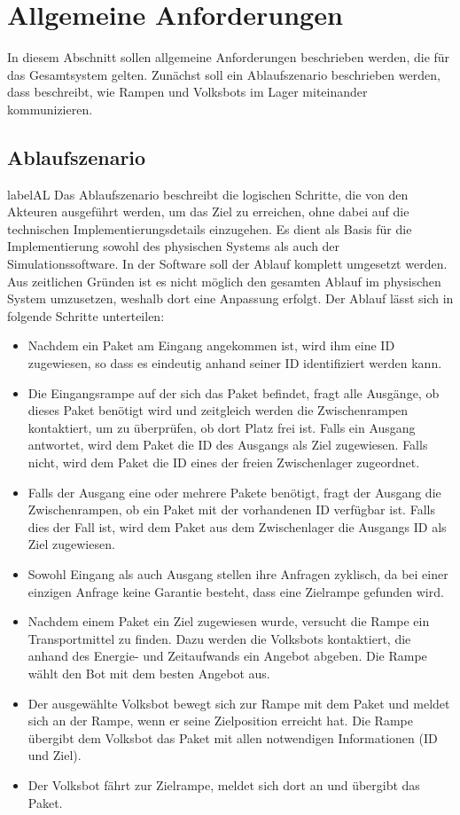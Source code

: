 \section{Allgemeine Anforderungen}
In diesem Abschnitt sollen allgemeine Anforderungen beschrieben werden, die für das Gesamtsystem gelten. Zunächst soll ein Ablaufszenario beschrieben werden, dass beschreibt, wie Rampen und Volksbots im Lager miteinander kommunizieren.
\subsection{Ablaufszenario}label{AL} 
Das Ablaufszenario beschreibt die logischen Schritte, die von den Akteuren ausgeführt werden, um das Ziel zu erreichen, ohne dabei auf die technischen Implementierungsdetails einzugehen. Es dient als Basis für die Implementierung sowohl des physischen Systems als auch der Simulationssoftware.
In der Software soll der Ablauf komplett umgesetzt werden. Aus zeitlichen Gründen ist es nicht möglich den gesamten Ablauf im physischen System umzusetzen, weshalb dort eine Anpassung erfolgt. Der Ablauf lässt sich in folgende Schritte unterteilen:

\begin{itemize}
\item Nachdem ein Paket am Eingang angekommen ist, wird ihm eine ID zugewiesen, so dass es eindeutig anhand seiner ID identifiziert werden kann.
\item Die Eingangsrampe auf der sich das Paket befindet, fragt alle Ausgänge, ob dieses Paket benötigt wird und zeitgleich werden die Zwischenrampen kontaktiert, um zu überprüfen, ob dort Platz frei ist. Falls ein Ausgang antwortet, wird dem Paket die ID des Ausgangs als Ziel zugewiesen. Falls nicht, wird dem Paket die ID eines der freien Zwischenlager zugeordnet.
\item
Falls der Ausgang eine oder mehrere Pakete benötigt, fragt der Ausgang die Zwischenrampen, ob ein Paket mit der vorhandenen ID verfügbar ist. Falls dies der Fall ist, wird dem Paket aus dem Zwischenlager die Ausgangs ID als Ziel zugewiesen.
\item
Sowohl Eingang als auch Ausgang stellen ihre Anfragen zyklisch, da bei einer einzigen Anfrage keine Garantie besteht, dass eine Zielrampe gefunden wird.
\item
Nachdem einem Paket ein Ziel zugewiesen wurde, versucht die Rampe ein Transportmittel zu finden. Dazu werden die Volksbots kontaktiert, die anhand des Energie- und Zeitaufwands ein Angebot abgeben. Die Rampe wählt den Bot mit dem besten Angebot aus.
\item
Der ausgewählte Volksbot bewegt sich zur Rampe mit dem Paket und meldet sich an der Rampe, wenn er seine Zielposition erreicht hat. Die Rampe übergibt dem Volksbot das Paket mit allen notwendigen Informationen (ID und Ziel).
\item
Der Volksbot fährt zur Zielrampe, meldet sich dort an und übergibt das Paket.
\end{itemize} 
